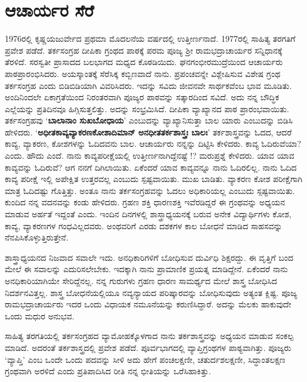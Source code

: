 {\section*{ಆಚಾರ್ಯರ ಸೆರೆ}

1976ರಲ್ಲಿ  ಕೃಷ್ಣಯಜುರ್ವೇದ ಪ್ರಥಮಾ ಮೊದಲನೆಯ ವರ್ಷದಲ್ಲಿ ಉತ್ತೀರ್ಣನಾದೆ.  1977ರಲ್ಲಿ ಸಾಹಿತ್ಯ ತರಗತಿಗೆ ಪ್ರವೇಶ ಪಡೆದೆ.  ತರ್ಕಸಂಗ್ರಹ ದೀಪಿಕಾ ಗ್ರಂಥದ ಪಾಠಕ್ಕೆ ಪರಮ ಪೂಜ್ಯ ಶ್ರೀ ರಾಮಭದ್ರಾಚಾರ್ಯರ ಸನ್ನಿಧಾನಕ್ಕೆ ತೆರಳಿದೆ.  ಸರಸ್ವತೀ ಪ್ರಾಸಾದದ ಬಲಭಾಗದ ಮಧ್ಯದ ಕೊಠಡಿಯಿದು.  ಘನಗಂಭೀರಮುದ್ರೆಯಿಂದ ಆಚಾರ್ಯರು ಪಾಠಪ್ರಾರಂಭಿಸಿದರು.  ಅಯಸ್ಕಾಂತಕ್ಕೆ ಸೆರೆಸಿಕ್ಕ ಕಬ್ಬಿಣವಾದೆ ನಾನು.  ಪ್ರಪಂಚ\-ವನ್ನೇ ವಿಶ್ಲೇಷಿಸುವ ವಿಶೇಷ ಗ್ರಂಥ ತರ್ಕಸಂಗ್ರಹ ಎಂದು ಬಿಡಿಬಿಡಿಯಾಗಿ ವಿವರಿಸಿದರು. ಇದನ್ನು ಸವಿದು ಜೀವನವೇ ಸಾರ್ಥಕವೆಂಬ ಭಾವ ಮೂಡಿತು.  ಅಂದಿ\-ನಿಂದಲೇ ಏಕಾಗ್ರತೆಯಿಂದ ನಿರಂತರವಾಗಿ ಪೂಜ್ಯರ ಪಾಠವನ್ನು ಸತ್ಕಾರದಿಂದ ಸವಿದೆ.  ಅದು ನನ್ನ ಬೌದ್ಧಿಕ ಎಲ್ಲೆಯನ್ನು ಪ್ರತಿದಿನವೂ ಹಿಗ್ಗಿಸುತ್ತಲಿತ್ತು.  ಅದನ್ನು ಸಂಭ್ರಮಿಸಿದೆ.  ದೀಪಿಕಾ ವ್ಯಾಖ್ಯಾನದ ಪಾಠ ಪ್ರಾರಂಭವಾಯಿತು. ತರ್ಕಸಂಗ್ರಹವು ‘\textbf{ಬಾಲಾನಾಂ ಸುಖ\-ಬೋಧಾಯ}’ ಎಂಬುದನ್ನು ವ್ಯಾಖ್ಯಾನಿಸುತ್ತಾ ಬಾಲ ಯಾರು ಎಂಬುದನ್ನು ಬಿಡಿಸಿ ಹೇಳಿದರು.  ‘\textbf{ಅಧೀತಕಾವ್ಯವ್ಯಾಕರಣಕೋಶಾದಿಮಾನ್ ಅನಧೀತತರ್ಕಶಾಸ್ತ್ರಃ ಬಾಲಃ}’  \enginline{-}   ತರ್ಕಶಾಸ್ತ್ರವನ್ನು ಓದದ, ಆದರೆ ಕಾವ್ಯ, ವ್ಯಾಕರಣ, ಕೋಶಗಳನ್ನು ಓದಿದವನು ಬಾಲ.  ಆಚಾರ್ಯರು ನನ್ನನ್ನು ದಿಟ್ಟಿಸಿ ಕೇಳಿದರು.  ಕಾವ್ಯ ಓದಿರುವೆಯಾ? ಎಂದು.  ಹೌದು ಎಂದೆ.  ನಾನು ಕಾವ್ಯಪರೀಕ್ಷೆಯಲ್ಲಿ ಉತ್ತೀರ್ಣನಾಗಿದ್ದೆನಷ್ಟೆ !?  ಮರುಪ್ರಶ್ನೆ ಕೇಳಿದರು.  ಯಾವ ಯಾವ ಕಾವ್ಯವನ್ನು ಓದಿರುವೆ?  ಆಗ ನನಗೆ ದಿಗಿಲಾಯಿತು.  ಏಕೆಂದರೆ ಯಾವ ಕಾವ್ಯವನ್ನೂ ನಾನು ಓದಿರಲಿಲ್ಲ.  ನಾನು ಓದಿದ ಕಾವ್ಯ ಪರೀಕ್ಷೆ ಇಲ್ಲಿ ಅಪೇಕ್ಷಿತ ಉತ್ತರ\-ವಲ್ಲ ಎಂಬುದು ಸ್ಪಷ್ಟವಾಯಿತು.  ಮುಖ ಬಾಡಿತು.  ವ್ಯಾಕರಣ ಕೋಶ ಪರೀಕ್ಷೆಗಾಗಿ ಮಾತ್ರ ಓದಿದಷ್ಟು ಗೊತ್ತಿತ್ತು. ಅಂತೂ ನಾನು ತರ್ಕಸಂಗ್ರಹವನ್ನು ಓದಲು ಅಧಿಕಾರಿಯಲ್ಲ ಎಂಬುದು ಸ್ಪಷ್ಟವಾಯಿತು.  ಕುಂದಿದ ನನ್ನ ವದನವನ್ನು ಕಂಡು ಹೇಳಿದರು.  ಗ್ರಹಣ ಶಕ್ತಿ ಧಾರಣಶಕ್ತಿ ಇವೆರಡಿದ್ದರೆ ಈ ಗ್ರಂಥವನ್ನು ಅಧ್ಯಯನ ಮಾಡುವ ಅರ್ಹತೆ ಇದ್ದಂತೆ ಎಂದು.  ಇಂದಿನ ದಿನಗಳಲ್ಲಿ ಶಾಸ್ತ್ರಾಧ್ಯಯನಕ್ಕೆ ಬರುವ ಅನೇಕ ವಿದ್ಯಾರ್ಥಿಗಳು ಕೋಶ, ಕಾವ್ಯ, ವ್ಯಾಕರಣಗಳ ಗಂಧವಿಲ್ಲದವರು.  ಅಂಥವರಿಗೆ ಎರಡು ದಶಕಗಳ ಕಾಲ ಬೋಧನೆ ಮಾಡಿದ ಸಾಹಸವನ್ನು ನೆನಪಿಸಿಕೊಳ್ಳುತ್ತಿರುತ್ತೇನೆ.    

ಶಾಸ್ತ್ರಾಧ್ಯಯನದ ನಿಜವಾದ ಸವಾಲೇ ಇದು.  ಅನಧಿಕಾರಿಗಳಿಗೆ ಬೋಧಿಸುವ ದುರ್ವಿಧಿ ಶಿಕ್ಷರದ್ದು.  ಈ ವೃತ್ತಿಗೆ ಬಂದ ಮೇಲೆ ಈ ಸವಾಲನ್ನು ಎದುರಿಸಲೇಬೇಕು.  ಇದಕ್ಕಾಗಿ ನಾನು ಪ್ರಾಮಾಣಿಕ ಪ್ರಯತ್ನ ಮಾಡಿದ್ದೇನೆ.  ಏಕೆಂದರೆ ನಾನು ಅನಧಿಕಾರಿ\-ಯಾಗಿಯೇ ಸೇರಿದ್ದೆನಲ್ಲ.  ನನ್ನ ಗುರುಗಳು ಗ್ರಹಣ ಧಾರಣ ಸಾಮರ್ಥ್ಯದ ಮೇಲೆ ಶಾಸ್ತ್ರ ಬೋಧಿಸಿದ ನಿದರ್ಶನವಿತ್ತಲ್ಲ.  ಶಾಸ್ತ್ರ ಬೋಧನೆಯಲ್ಲಿಯೂ ನವ್ಯನ್ಯಾಯದ ಪರಿಷ್ಕಾರವನ್ನು ಬೋಧಿಸುವುದು ಅತ್ಯಂತ ಕ್ಲಿಷ್ಟ.  ಪೂಜ್ಯ ರಾಮಭದ್ರಾಚಾರ್ಯರು ಇದರ ಒಂದು ವಿಧಾಯಕ ನಮೂನೆಯನ್ನು ಕರುಣಿಸಿದ್ದಾರೆ. ಅದನ್ನು ಮೆಲಕು ಹಾಕುವುದೇ ಒಂದು ಮಧುರ ಅನುಭವ.  

ಸಾಹಿತ್ಯ ತರಗತಿಯಲ್ಲಿ ತರ್ಕಸಂಗ್ರಹದ ವ್ಯಾಮೋಹಕ್ಕೊಳಗಾದ ನಾನು ತರ್ಕಶಾಸ್ತ್ರವನ್ನು ಅಧ್ಯಯನ ಮಾಡುವ ಸಂಕಲ್ಪ ಮಾಡಿದೆ.  ಅದರಂತೆ ತರ್ಕಶಾಸ್ತ್ರದಲ್ಲಿ ಪ್ರವೇಶ ಪಡೆದೆ.  ಪೂರ್ವಭಾಗದಲ್ಲಿ ವ್ಯಾಪ್ತಿಗ್ರಂಥಗಳ ಪಾಠ್ಯವಾಗಿತ್ತು.  ಪೂಜ್ಯರು ‘ವ್ಯಾಪ್ತಿ’ ಎಂಬ ಒಂದೇ ಒಂದು ಪದವನ್ನು ಸೀಳಿ ಅದು ಹೇಗೆ ಪಂಚಲಕ್ಷಣೀ, ಚತುರ್ದಶಲಕ್ಷಣೀ, ಸಿದ್ಧಾಂತಲಕ್ಷಣ ಗ್ರಂಥವಾಗಿ ಅರಳಿದೆ ಎಂದು ಪ್ರತಿಪಾದಿಸಿದ ರೀತಿ ನನ್ನ ಭೀತಿಯನ್ನು ಒರೆಸಿಹಾಕಿತ್ತು.  

}
